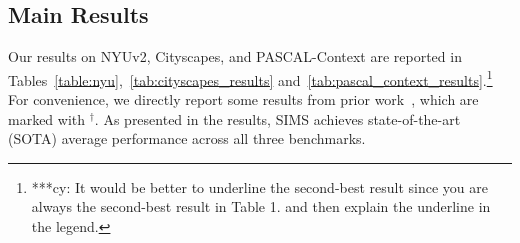 \documentclass[sigconf]{acmart}
\begin{document}
\begin{table}[!pbht]
{\begin{tabular}{ccccccccccc}
\bottomrule
\end{tabular}
}
\vspace{-3pt}
\end{table}

\subsection{Main Results}

Our results on NYUv2, Cityscapes, and PASCAL-Context are reported in Tables~\ref{table:nyu},~\ref{tab:cityscapes_results} and~\ref{tab:pascal_context_results}.\footnote{***cy: It would be better to underline the second-best result since you are always the second-best result in Table 1. and then explain the underline in the legend. } For convenience, we directly report some results from prior work~\cite{wang2025mtsam}, which are marked with $^{\dagger}$.
As presented in the results, SIMS achieves state-of-the-art (SOTA) average performance across all three benchmarks. 
\end{document}
